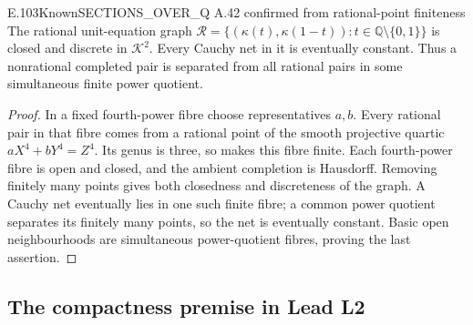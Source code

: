 \begin{result}{E.103}{Known}{SECTIONS\_OVER\_Q A.42 confirmed from rational-point finiteness}
The rational unit-equation graph
$\mathcal R=\{(\kappa(t),\kappa(1-t)):t\in\mathbb Q\setminus\{0,1\}\}$
is closed and discrete in $\mathcal K^2$. Every Cauchy net in it is
eventually constant. Thus a nonrational completed pair is separated
from all rational pairs in some simultaneous finite power quotient.
\end{result}
\begin{proof}
In a fixed fourth-power fibre choose representatives $a,b$.
Every rational pair in that fibre comes from a rational point of the
smooth projective quartic $aX^4+bY^4=Z^4$. Its genus is three, so
\citet[Satz~7, p.~365]{Faltings1983} makes this fibre finite. Each fourth-power
fibre is open and closed, and the ambient completion is Hausdorff.
Removing finitely many points gives both closedness and discreteness
of the graph. A Cauchy net eventually lies in one such finite fibre;
a common power quotient separates its finitely many points, so the
net is eventually constant. Basic open neighbourhoods are simultaneous
power-quotient fibres, proving the last assertion.
\end{proof}

\subsection{The compactness premise in Lead L2}

